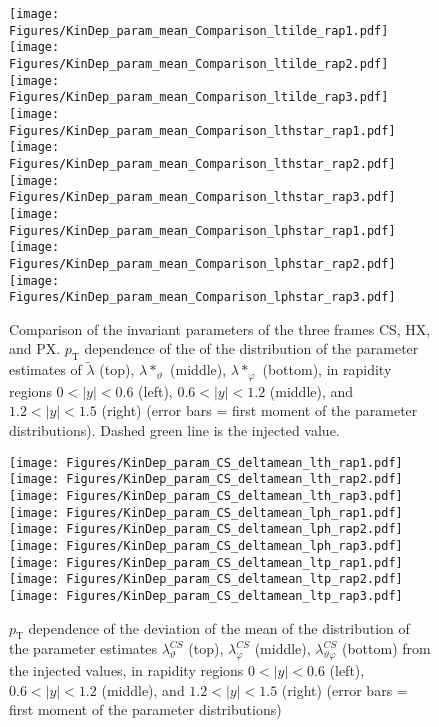 \documentclass[12pt]{article}
\newcommand{\pT}{p_\mathrm{T}}
\newcommand{\absy}{\left |  y \right |}
\newcommand{\lamtilde}{\tilde{\lambda}}
\newcommand{\lamthstar}{\lambda*_\vartheta}
\newcommand{\lamphstar}{\lambda*_\varphi}
\newcommand{\lamthCS}{\lambda^{\scriptscriptstyle CS}_\vartheta}
\newcommand{\lamphCS}{\lambda^{\scriptscriptstyle CS}_\varphi}
\newcommand{\lamthphCS}{\lambda^{\scriptscriptstyle CS}_{\vartheta \varphi}}
\begin{document}




\begin{figure}[htbp]
\centering
\texttt{[image: Figures/KinDep\_param\_mean\_Comparison\_ltilde\_rap1.pdf]}
\texttt{[image: Figures/KinDep\_param\_mean\_Comparison\_ltilde\_rap2.pdf]}
\texttt{[image: Figures/KinDep\_param\_mean\_Comparison\_ltilde\_rap3.pdf]}
\texttt{[image: Figures/KinDep\_param\_mean\_Comparison\_lthstar\_rap1.pdf]}
\texttt{[image: Figures/KinDep\_param\_mean\_Comparison\_lthstar\_rap2.pdf]}
\texttt{[image: Figures/KinDep\_param\_mean\_Comparison\_lthstar\_rap3.pdf]}
\texttt{[image: Figures/KinDep\_param\_mean\_Comparison\_lphstar\_rap1.pdf]}
\texttt{[image: Figures/KinDep\_param\_mean\_Comparison\_lphstar\_rap2.pdf]}
\texttt{[image: Figures/KinDep\_param\_mean\_Comparison\_lphstar\_rap3.pdf]}
\caption{Comparison of the invariant parameters of the three frames CS, HX,
and PX. $\pT$ dependence of the of the distribution of the
parameter estimates of $\lamtilde$ (top), $\lamthstar$ (middle), $\lamphstar$ (bottom), in rapidity regions $0<\absy<0.6$ (left), 
$0.6<\absy<1.2$ (middle), and $1.2<\absy<1.5$ (right) (error bars = first moment of the parameter
distributions). Dashed green line is the injected value.}
\end{figure}
\clearpage











\begin{figure}[htbp]
\centering
\texttt{[image: Figures/KinDep\_param\_CS\_deltamean\_lth\_rap1.pdf]}
\texttt{[image: Figures/KinDep\_param\_CS\_deltamean\_lth\_rap2.pdf]}
\texttt{[image: Figures/KinDep\_param\_CS\_deltamean\_lth\_rap3.pdf]}
\texttt{[image: Figures/KinDep\_param\_CS\_deltamean\_lph\_rap1.pdf]}
\texttt{[image: Figures/KinDep\_param\_CS\_deltamean\_lph\_rap2.pdf]}
\texttt{[image: Figures/KinDep\_param\_CS\_deltamean\_lph\_rap3.pdf]}
\texttt{[image: Figures/KinDep\_param\_CS\_deltamean\_ltp\_rap1.pdf]}
\texttt{[image: Figures/KinDep\_param\_CS\_deltamean\_ltp\_rap2.pdf]}
\texttt{[image: Figures/KinDep\_param\_CS\_deltamean\_ltp\_rap3.pdf]}
\caption{$\pT$ dependence of the deviation of the mean of the distribution of
the parameter estimates $\lamthCS$ (top), $\lamphCS$ (middle), $\lamthphCS$
(bottom) from the injected values, in rapidity regions $0<\absy<0.6$ (left), 
$0.6<\absy<1.2$ (middle), and $1.2<\absy<1.5$ (right) (error bars = first moment of the parameter
distributions)}
\end{figure}
\clearpage
\end{document}

